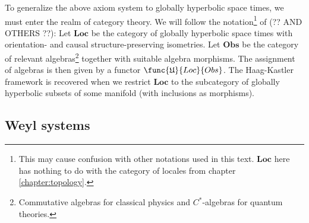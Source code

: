     To generalize the above axiom system to globally hyperbolic space times, we must enter the realm of category theory. We will follow the notation\footnote{This may cause confusion with other notations used in this text. $\mathbf{Loc}$ here has nothing to do with the category of locales from chapter \ref{chapter:topology}.} of \cite{cal_strobl} (?? AND OTHERS ??): Let $\textbf{Loc}$ be the category of globally hyperbolic space times with orientation- and causal structure-preserving isometries. Let $\textbf{Obs}$ be the category of relevant algebras\footnote{Commutative algebras for classical physics and $C^*$-algebras for quantum theories.} together with suitable algebra morphisms. The assignment of algebras is then given by a functor $\func{\mathfrak{U}}{Loc}{Obs}$. The Haag-Kastler framework is recovered when we restrict $\textbf{Loc}$ to the subcategory of globally hyperbolic subsets of some manifold (with inclusions as morphisms).

\subsection{Weyl systems}



